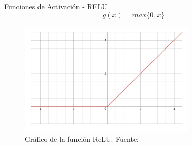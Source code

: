 \documentclass[10pt]{beamer}
\begin{document}


\begin{frame}{Funciones de Activación - RELU}
    \begin{equation}\label{eq:relu}
        g(x) = max\{0,x\}
    \end{equation}

    \begin{figure}[!h] 
        \centering
        \includegraphics[width=0.75\textwidth]{../img/relu}
        \caption[Gráfico de la función ReLU]{Gráfico de la función ReLU. Fuente: \cite{wang_2016} }
    \end{figure}
\end{frame}
\end{document}
